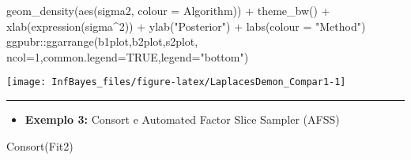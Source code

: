 \documentclass[
]{book}
\newenvironment{Shaded}{\begin{snugshade}}{\end{snugshade}}
\newcommand{\AttributeTok}[1]{\textcolor[rgb]{0.77,0.63,0.00}{#1}}
\newcommand{\ConstantTok}[1]{\textcolor[rgb]{0.00,0.00,0.00}{#1}}
\newcommand{\DecValTok}[1]{\textcolor[rgb]{0.00,0.00,0.81}{#1}}
\newcommand{\FunctionTok}[1]{\textcolor[rgb]{0.00,0.00,0.00}{#1}}
\newcommand{\NormalTok}[1]{#1}
\newcommand{\SpecialCharTok}[1]{\textcolor[rgb]{0.00,0.00,0.00}{#1}}
\newcommand{\StringTok}[1]{\textcolor[rgb]{0.31,0.60,0.02}{#1}}
\providecommand{\tightlist}{%
  \setlength{\itemsep}{0pt}\setlength{\parskip}{0pt}}
\begin{document}
\begin{Shaded}
\begin{Highlighting}[]
  \FunctionTok{geom\_density}\NormalTok{(}\FunctionTok{aes}\NormalTok{(sigma2, }\AttributeTok{colour =}\NormalTok{ Algorithm)) }\SpecialCharTok{+} \FunctionTok{theme\_bw}\NormalTok{() }\SpecialCharTok{+}
  \FunctionTok{xlab}\NormalTok{(}\FunctionTok{expression}\NormalTok{(sigma}\SpecialCharTok{\^{}}\DecValTok{2}\NormalTok{)) }\SpecialCharTok{+} \FunctionTok{ylab}\NormalTok{(}\StringTok{"Posterior"}\NormalTok{) }\SpecialCharTok{+} \FunctionTok{labs}\NormalTok{(}\AttributeTok{colour =} \StringTok{"Method"}\NormalTok{)}
\NormalTok{ggpubr}\SpecialCharTok{::}\FunctionTok{ggarrange}\NormalTok{(b1plot,b2plot,s2plot,}
                  \AttributeTok{ncol=}\DecValTok{1}\NormalTok{,}\AttributeTok{common.legend=}\ConstantTok{TRUE}\NormalTok{,}\AttributeTok{legend=}\StringTok{"bottom"}\NormalTok{)}
\end{Highlighting}
\end{Shaded}

\begin{center}\texttt{[image: InfBayes\_files/figure-latex/LaplacesDemon\_Compar1-1]} \end{center}

\begin{center}\rule{0.5\linewidth}{0.5pt}\end{center}

\begin{itemize}
\tightlist
\item
  \textbf{Exemplo 3:} Consort e Automated Factor Slice Sampler (AFSS)
\end{itemize}

\begin{Shaded}
\begin{Highlighting}[]
\FunctionTok{Consort}\NormalTok{(Fit2)}
\end{Highlighting}
\end{Shaded}
\end{document}
